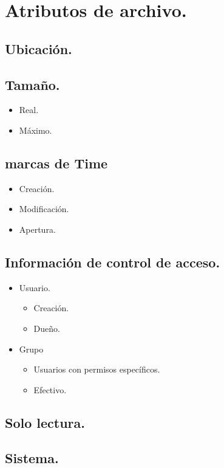 \newpage
\chapter{Atributos de archivo.}

\section{Ubicaci\'{o}n.}

\section{Tama\~{n}o.}
\begin{itemize}
	\item Real.
	\item M\'{a}ximo.
\end{itemize}

\section{marcas de Time}
\begin{itemize}
	\item Creaci\'{o}n.
	\item Modificaci\'{o}n.
	\item Apertura.
\end{itemize}

\section{Informaci\'{o}n de control de acceso.}
\begin{itemize}
	\item Usuario.
	\begin{itemize}
		\item Creaci\'{o}n.
		\item Due\~{n}o.
	\end{itemize}
	\item Grupo
	\begin{itemize}
		\item Usuarios con permisos espec\'{i}ficos.
		\item Efectivo.
	\end{itemize}
\end{itemize}

\section{Solo lectura.}
\section{Sistema.}
